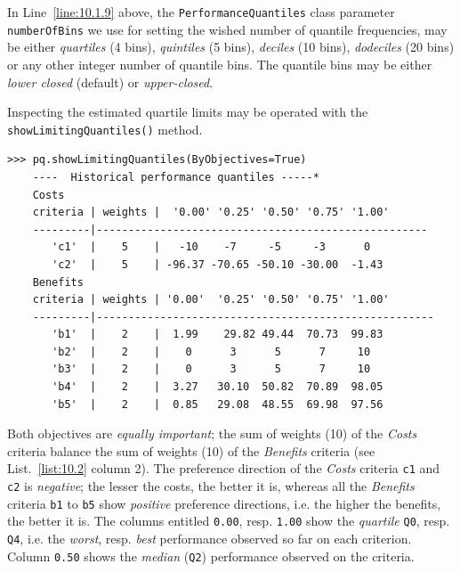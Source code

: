 In Line~\ref{line:10.1.9} above, the \texttt{PerformanceQuantiles} class parameter \texttt{number\-OfBins} we use for setting the wished number of quantile frequencies, may be either \emph{quartiles} (4 bins), \emph{quintiles} (5 bins), \emph{deciles} (10 bins), \emph{dodeciles} (20 bins) or any other integer number of quantile bins. The quantile bins may be either \emph{lower closed} (default) or \emph{upper-closed}.

Inspecting the estimated quartile limits may be operated with the \texttt{showLimi\-tingQuantiles()} method.
\begin{lstlisting}[caption={Printing out the estimated quartile limits},label=list:10.2]
>>> pq.showLimitingQuantiles(ByObjectives=True)
    ----  Historical performance quantiles -----*
    Costs
    criteria | weights |  '0.00' '0.25' '0.50' '0.75' '1.00'   
    ---------|----------------------------------------------------
       'c1'  |    5    |   -10    -7     -5     -3      0  
       'c2'  |    5    | -96.37 -70.65 -50.10 -30.00  -1.43  
    Benefits
    criteria | weights | '0.00'  '0.25' '0.50' '0.75' '1.00'   
    ---------|-----------------------------------------------------
       'b1'  |    2    |  1.99    29.82 49.44  70.73  99.83  
       'b2'  |    2    |    0      3      5      7     10  
       'b3'  |    2    |    0      3      5      7     10  
       'b4'  |    2    |  3.27   30.10  50.82  70.89  98.05  
       'b5'  |    2    |  0.85   29.08  48.55  69.98  97.56  
\end{lstlisting}
Both objectives are \emph{equally important}; the sum of weights (10) of the \emph{Costs} criteria balance the sum of weights (10) of the \emph{Benefits} criteria (see List.~\vref{list:10.2} column 2). The preference direction of the \emph{Costs} criteria \texttt{c1} and \texttt{c2} is \emph{negative}; the lesser the costs, the better it is, whereas all the \emph{Benefits} criteria \texttt{b1} to \texttt{b5} show \emph{positive} preference directions, i.e. the higher the benefits, the better it is. The columns entitled \texttt{0.00}, resp. \texttt{1.00} show the \emph{quartile} \texttt{Q0}, resp. \texttt{Q4}, i.e. the \emph{worst}, resp. \emph{best} performance observed so far on each criterion. Column \texttt{0.50} shows the \emph{median} (\texttt{Q2}) performance observed on the criteria.  


